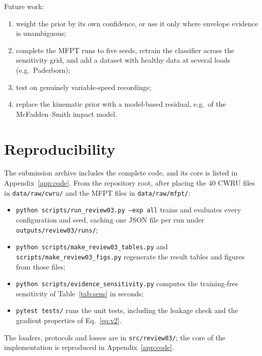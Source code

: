 \documentclass[conference]{IEEEtran}
\begin{document}
Future work:
\begin{enumerate}
\item weight the prior by its own confidence, or use it only where envelope
evidence is unambiguous;
\item complete the MFPT runs to five seeds, retrain the classifier across the
sensitivity grid, and add a dataset with healthy data at several loads
(e.g.\ Paderborn);
\item test on genuinely variable-speed recordings;
\item replace the kinematic prior with a model-based residual, e.g.\ of the
McFadden--Smith impact model.
\end{enumerate}

\section{Reproducibility}
\label{sec:repro}
The submission archive includes the complete code, and its core is listed in
Appendix~\ref{app:code}. From the repository root,
after placing the 40 CWRU files in \texttt{data/raw/cwru/} and the MFPT files in
\texttt{data/raw/mfpt/}:
\begin{itemize}
\item \texttt{python scripts/run\_review03.py --exp all} trains and evaluates
every configuration and seed, caching one JSON file per run under
\texttt{outputs/review03/runs/};
\item \texttt{python scripts/make\_review03\_tables.py} and
\texttt{scripts/make\_review03\_figs.py} regenerate the result tables and figures from those files;
\item \texttt{python scripts/evidence\_sensitivity.py} computes the
training-free sensitivity of Table~\ref{tab:sens} in seconds;
\item \texttt{pytest tests/} runs the unit tests, including the leakage check
and the gradient properties of Eq.~\eqref{eq:v2}.
\end{itemize}
The loaders, protocols and losses are in \texttt{src/review03/}; the core of
the implementation is reproduced in Appendix~\ref{app:code}.

\appendices
\end{document}

